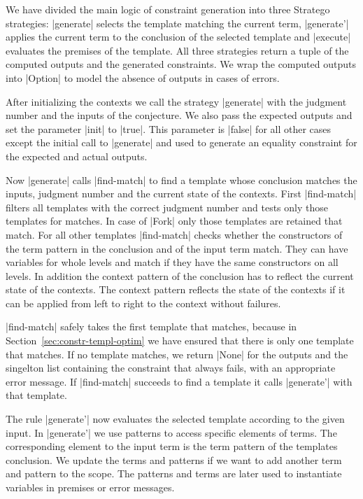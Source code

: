 We have divided the main logic of constraint generation into three
Stratego strategies: \code|generate| selects the template matching the
current term, \code|generate'| applies the current term to the
conclusion of the selected template and \code|execute| evaluates the
premises of the template. All three strategies return a tuple of the
computed outputs and the generated constraints. We wrap the computed
outputs into \code|Option| to model the absence of outputs in cases of
errors.

After initializing the contexts we call the strategy \code|generate|
with the judgment number and the inputs of the conjecture. We also
pass the expected outputs and set the parameter \code|init| to
\code|true|. This parameter is \code|false| for all other cases except
the initial call to \code|generate| and used to generate an equality
constraint for the expected and actual outputs.

Now \code|generate| calls \code|find-match| to find a template whose
conclusion matches the inputs, judgment number and the current state
of the contexts. First \code|find-match| filters all templates with
the correct judgment number and tests only those templates for
matches.  In case of
\code|Fork| only those templates are retained that match. For all
other templates \code|find-match| checks whether the constructors of
the term pattern in the conclusion and of the input term match. They
can have variables for whole levels and match if they have the same
constructors on all levels. In addition the context pattern of the
conclusion has to reflect the current state of the contexts. The
context pattern reflects the state of the contexts if it can be
applied from left to right to the context without failures.

\code|find-match| safely takes the first template that matches,
because in Section~\ref{sec:constr-templ-optim} we have ensured that
there is only one template that matches. If no template matches, we
return \code|None| for the outputs and the singelton list containing
the constraint that always fails, with an appropriate error
message. If \code|find-match| succeeds to find a template it calls
\code|generate'| with that template.

The rule \code|generate'| now evaluates the selected template
according to the given input. In \code|generate'| we use patterns to
access specific elements of terms. The corresponding element to the
input term is the term pattern of the templates conclusion. We update
the terms and patterns if we want to add another term and pattern to
the scope. The patterns and terms are later used to instantiate
variables in premises or error messages.

